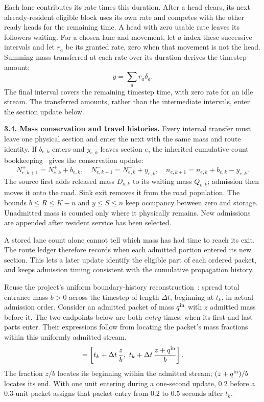 \documentclass[10pt,a4paper]{article}
\newcommand{\rev}[1]{{\color{revisionred}#1}}
\begin{document}
Each lane contributes its rate times this duration. After a head clears,
its next already-resident eligible block uses its own rate and competes
with the other ready heads for the remaining time. A head with zero
usable rate leaves its followers waiting. For a chosen lane and movement,
let $a$ index these successive intervals and let $r_a$ be its granted
rate, zero when that movement is not the head.
\rev{Summing mass transferred at each rate over its duration derives the timestep amount:}
\begin{equation}
 y=\sum_a r_a\delta_a.
 \label{eq:compact-service-amount}
\end{equation}
The final interval covers the remaining timestep time, with zero rate
for an idle stream. The transferred amounts, rather than the intermediate
intervals, enter the section update below.
\par

\textbf{3.4. Mass conservation and travel histories.}
Every internal transfer must leave one physical section and enter the
next with the same mass and route identity. If $b_{e,k}$ enters and
$y_{e,k}$ leaves section $e$,
\rev{the inherited cumulative-count bookkeeping~\cite{m0,m1} gives the conservation update:}
\begin{equation}
 N^+_{e,k+1}=N^+_{e,k}+b_{e,k},\quad
 N^-_{e,k+1}=N^-_{e,k}+y_{e,k},\quad
 n_{e,k+1}=n_{e,k}+b_{e,k}-y_{e,k}.
 \label{eq:compact-update}
\end{equation}
The source first adds released mass $D_{o,k}$ to its waiting mass $Q_{o,k}$;
admission then moves it onto the road. Sink exit removes it from the
road population. The bounds $b\leq R\leq K-n$ and $y\leq S\leq n$
keep occupancy between zero and storage. Unadmitted mass is counted
only where it physically remains. New admissions are appended after
resident service has been selected.


A stored lane count alone cannot tell which mass has had time to reach
its exit. The route ledger therefore records when each admitted portion
entered its new section. This lets a later update identify the eligible
part of each ordered packet, and keeps admission timing consistent with
the cumulative propagation history.

\rev{Reuse the project's uniform boundary-history reconstruction~\cite{m1}:} spread total
entrance mass $b>0$ across the timestep of length $\Delta t$, beginning at
$t_k$, in actual admission order. Consider an admitted packet of mass
$q^{\rm in}$ with $z$ admitted mass before it. The two endpoints below
are both \emph{entry} times: when its first and last parts enter.
\rev{Their expressions follow from locating the packet's mass fractions within this uniformly admitted stream.}
\begin{equation}
 [t^{\rm in}_{\rm front},t^{\rm in}_{\rm tail}]
 =\left[t_k+\Delta t\,\frac z b,\
       t_k+\Delta t\,\frac{z+q^{\rm in}}b\right].
 \label{eq:compact-entry}
\end{equation}
The fraction $z/b$ locates its beginning within the admitted stream;
$(z+q^{\rm in})/b$ locates its end. With one unit entering during a
one-second update, $0.2$ before a $0.3$-unit packet assigns that packet
entry from $0.2$ to $0.5$ seconds after $t_k$.
\end{document}
